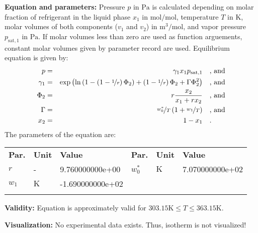 \textbf{Equation and parameters:}
\newline
%
Pressure $p$ in $\si{\pascal}$ is calculated depending on molar fraction of refrigerant in the liquid phase $x_1$ in $\si{\mole\per\mole}$, temperature $T$ in $\si{\kelvin}$, molar volumes of both components ($v_1$ and $v_2$) in $\si{\cubic\meter\per\mole}$, and vapor pressure $p_\mathrm{sat,1}$ in $\si{\pascal}$. If molar volumes less than zero are used as function arguements, constant molar volumes given by parameter record are used. Equilibrium equation is given by:
%
\begin{equation*}
\begin{split}
p &=& \gamma_1 x_1 p_\mathrm{sat,1} & \quad\text{, and} \\
\gamma_1 &=& \exp \left( \ln \left( 1 - \left( 1 - \nicefrac{1}{r} \right) \Phi_2  \right) + \left(1 - \nicefrac{1}{r}\right) \Phi_2 + \Gamma \Phi_2 ^2 \right) & \quad\text{, and} \\
\Phi_2 &=& r \frac{x_2}{x_1 + r x_2} & \quad\text{, and} \\
\Gamma &=& \nicefrac{w_0^{*}}{T} \left( 1 + \nicefrac{w_1}{T} \right) & \quad\text{, and} \\
x_2 &=& 1 - x_1  & \quad\text{.} \\
\end{split}
\end{equation*}
%
The parameters of the equation are:
%
\begin{longtable}[l]{lll|lll}
\toprule
\addlinespace
\textbf{Par.} & \textbf{Unit} & \textbf{Value} &	\textbf{Par.} & \textbf{Unit} & \textbf{Value} \\
\addlinespace
\midrule
\endhead

\bottomrule
\endfoot
\bottomrule
\endlastfoot
\addlinespace

$r$ & - & 9.760000000e+00 & $w_0^{*}$ & $\si{\kelvin}$ & 7.070000000e+02 \\
$w_1$ & $\si{\kelvin}$ & -1.690000000e+02 & & & \\

\addlinespace\end{longtable}

\textbf{Validity:}
\newline
Equation is approximately valid for $303.15 \si{\kelvin} \leq T \leq 363.15 \si{\kelvin}$.
\newline

\textbf{Visualization:}
%
\newline
No experimental data exists. Thus, isotherm is not visualized!
%

